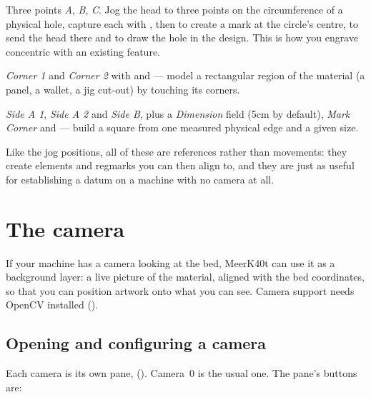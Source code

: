 \begin{description}[leftmargin=1.4em,style=nextline]
  \item[\tabname{Find center}] Three points \emph{A}, \emph{B}, \emph{C}. Jog the
        head to three points on the circumference of a physical hole, capture
        each with , then  to create a mark at
        the circle's centre,  to send the head there and
         to draw the hole in the design. This is how you
        engrave concentric with an existing feature.
  \item[\tabname{Place frame}] \emph{Corner 1} and \emph{Corner 2} with
         and  --- model a rectangular region
        of the material (a panel, a wallet, a jig cut-out) by touching its
        corners.
  \item[\tabname{Place square}] \emph{Side A 1}, \emph{Side A 2} and \emph{Side
        B}, plus a \emph{Dimension} field (5\unit{cm} by default), \emph{Mark
        Corner} and  --- build a square from one measured
        physical edge and a given size.
\end{description}

\noindent Like the jog positions, all of these are references rather than
movements: they create elements and regmarks you can then align to, and they are
just as useful for establishing a datum on a machine with no camera at all.

\section{The camera}

If your machine has a camera looking at the bed, MeerK40t can use it as a
background layer: a live picture of the material, aligned with the bed
coordinates, so that you can position artwork onto what you can see. Camera
support needs OpenCV installed ().

\subsection*{Opening and configuring a camera}

Each camera is its own pane,  ().
Camera~0 is the usual one. The pane's buttons are:


